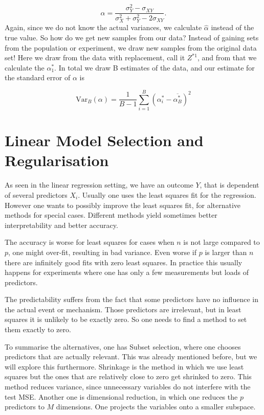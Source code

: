 \documentclass{article}
\begin{document}
\[
\alpha = \frac{\sigma_Y^2 - \sigma_{XY}}{\sigma_X^2+\sigma_Y^2 - 2\sigma_{XY}}.
\]
Again, since we do not know the actual variances, we calculate $\hat{\alpha}$ instead of the true value. So how do we get new samples from our data? Instead of gaining sets from the population or experiment, we draw new samples from the original data set! Here we draw from the data with replacement, call it $Z^{*1}$, and from that we calculate the $\alpha^{*}_1$. In total we draw B estimates of the data, and our estimate for the standard error of $\alpha$ is 

\begin{equation}
    \text{Var}_B(\alpha) = \frac{1}{B-1} \sum_{i=1}^B(\alpha^{*}_i - \overline{\alpha ^{*}_B})^2
\end{equation}
\newpage

\section{Linear Model Selection and Regularisation}

As seen in the linear regression setting, we have an outcome $Y$, that is dependent of several predictors $X_i$. Usually one uses the least squares fit for the regression. However one wants to possibly improve the least squares fit, for alternative methods for special cases. Different methods yield sometimes better interpretability and better accuracy. 

The accuracy is worse for least squares for cases when $n$ is not large compared to $p$, one might over-fit, resulting in bad variance. Even worse if $p$ is larger than $n$ there are infinitely good fits with zero least squares. In practice this usually happens for experiments where one has only a few measurements but loads of predictors. 

The predictability suffers from the fact that some predictors have no influence in the actual event or mechanism. Those predictors are irrelevant, but in least squares it is unlikely to be exactly zero. So one needs to find a method to set them exactly to zero.

To summarise the alternatives, one has Subset selection, where one chooses predictors that are actually relevant. This was already mentioned before, but we will explore this furthermore. Shrinkage is the method in which we use least squares but the ones that are relatively close to zero get shrinked to zero. This method reduces variance, since unnecessary variables do not interfere with the test MSE. Another one is dimensional reduction, in which one reduces the $p$ predictors to $M$ dimensions. One projects the variables onto a smaller subspace.  
\end{document}
